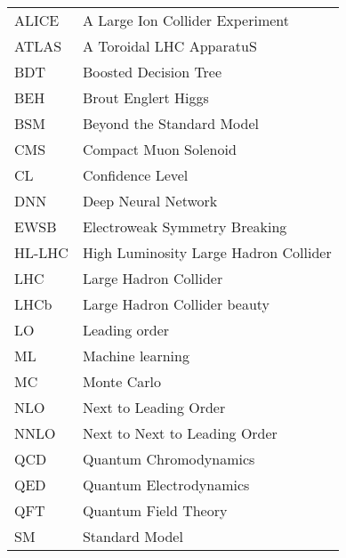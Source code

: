 \singlespacing
\begin{tabular}{l p{5in}} 
ALICE  & A Large Ion Collider Experiment\\
ATLAS  & A Toroidal LHC ApparatuS\\
BDT    & Boosted Decision Tree\\
BEH    & Brout Englert Higgs\\
BSM    & Beyond the Standard Model\\
CMS    & Compact Muon Solenoid\\
CL     & Confidence Level\\
DNN    & Deep Neural Network\\
EWSB   & Electroweak Symmetry Breaking \\
HL-LHC & High Luminosity Large Hadron Collider\\
LHC    & Large Hadron Collider\\
LHCb   & Large Hadron Collider beauty\\
LO     & Leading order\\
ML     & Machine learning\\
MC     & Monte Carlo\\
NLO    & Next to Leading Order\\
NNLO   & Next to Next to Leading Order\\
QCD    & Quantum Chromodynamics\\
QED    & Quantum Electrodynamics\\
QFT    & Quantum Field Theory\\
SM     & Standard Model\\
\end{tabular}
\doublespacing